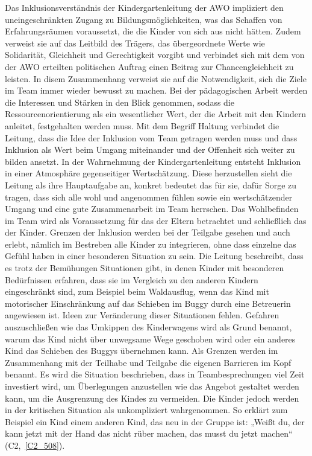 Das Inklusionsverständnis der Kindergartenleitung der AWO impliziert den uneingeschränkten Zugang zu Bildungsmöglichkeiten, was das Schaffen von Erfahrungsräumen voraussetzt, die die Kinder von sich aus nicht hätten. Zudem verweist sie auf das Leitbild des Trägers, das übergeordnete Werte wie Solidarität, Gleichheit und Gerechtigkeit vorgibt und verbindet sich mit dem von der AWO erteilten politischen Auftrag einen Beitrag zur Chancengleichheit zu leisten. In disem Zusammenhang verweist sie auf die Notwendigkeit, sich die Ziele im Team immer wieder bewusst zu machen. Bei der pädagogischen Arbeit werden die Interessen und Stärken in den Blick genommen, sodass die Ressourcenorientierung als ein wesentlicher Wert, der die Arbeit mit den Kindern anleitet, festgehalten werden muss. 
Mit dem Begriff Haltung verbindet die Leitung, dass die Idee der Inklusion vom Team getragen werden muss und dass Inklusion als Wert  beim Umgang miteinander und der Offenheit sich weiter zu bilden ansetzt. In der Wahrnehmung der Kindergartenleitung entsteht Inklusion in einer Atmosphäre gegenseitiger Wertschätzung. Diese herzustellen sieht die Leitung als ihre Hauptaufgabe an, konkret bedeutet das für sie, dafür Sorge zu tragen, dass sich alle wohl und angenommen fühlen sowie ein wertschätzender Umgang und eine gute Zusammenarbeit im Team herrschen. Das Wohlbefinden im Team wird als Voraussetzung für das der Eltern betrachtet und schließlich das der Kinder. 
Grenzen der Inklusion werden bei der Teilgabe gesehen und auch erlebt, nämlich im Bestreben alle Kinder zu integrieren, ohne dass einzelne das Gefühl haben in einer besonderen Situation zu sein.    
Die Leitung beschreibt, dass es trotz der Bemühungen Situationen gibt, in denen Kinder mit besonderen Bedürfnissen erfahren, dass sie im Vergleich zu den anderen Kindern eingeschränkt sind, zum Beispiel beim Waldausflug, wenn das Kind mit motorischer Einschränkung auf das Schieben im Buggy durch eine Betreuerin angewiesen ist. Ideen zur Veränderung dieser Situationen fehlen. Gefahren auszuschließen wie das Umkippen des Kinderwagens wird als Grund benannt, warum das Kind nicht über unwegsame Wege geschoben wird oder ein anderes Kind das Schieben des Buggys übernehmen kann. Als Grenzen werden im Zusammenhang mit der Teilhabe und Teilgabe die eigenen Barrieren im Kopf benannt. Es wird die Situation beschrieben, dass in Teambesprechungen viel Zeit investiert wird, um Überlegungen anzustellen wie das Angebot gestaltet werden kann, um die Ausgrenzung des Kindes zu vermeiden. Die Kinder jedoch werden in der kritischen Situation als unkompliziert wahrgenommen. So erklärt zum Beispiel ein Kind einem anderen Kind, das neu in der Gruppe ist: „Weißt du, der kann jetzt mit der Hand das nicht rüber machen, das musst du jetzt machen“ (C2,~\ref{C2_508}).
